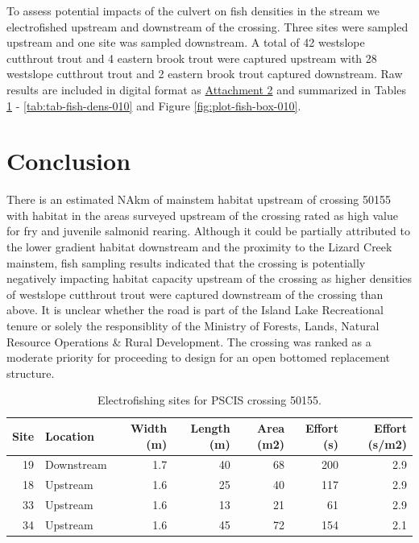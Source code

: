 \documentclass[
]{book}
\begin{document}
To assess potential impacts of the culvert on fish densities in the stream we electrofished upstream and downstream of the crossing. Three sites were sampled upstream and one site was sampled downstream. A total of 42 westslope cutthrout trout and 4 eastern brook trout were captured upstream with 28 westslope cutthrout trout and 2 eastern brook trout captured downstream. Raw results are included in digital format as \href{https://github.com/NewGraphEnvironment/fish_passage_elk_2020_reporting/raw/master/data/habitat_confirmations.xls}{Attachment 2} and summarized in Tables \ref{tab:tab-fish-site-010} - \ref{tab:tab-fish-dens-010} and Figure \ref{fig:plot-fish-box-010}.

\hypertarget{conclusion-1}{%
\section*{Conclusion}\label{conclusion-1}}

There is an estimated NAkm of mainstem habitat upstream of crossing 50155 with habitat in the areas surveyed upstream of the crossing rated as high value for fry and juvenile salmonid rearing. Although it could be partially attributed to the lower gradient habitat downstream and the proximity to the Lizard Creek mainstem, fish sampling results indicated that the crossing is potentially negatively impacting habitat capacity upstream of the crossing as higher densities of westslope cutthrout trout were captured downstream of the crossing than above. It is unclear whether the road is part of the Island Lake Recreational tenure or solely the responsiblity of the Ministry of Forests, Lands, Natural Resource Operations \& Rural Development. The crossing was ranked as a moderate priority for proceeding to design for an open bottomed replacement structure.

\begin{table}

\caption{\label{tab:tab-fish-site-010}Electrofishing sites for PSCIS crossing 50155.}
\centering
\begin{tabular}[t]{r|l|r|r|r|r|r}
\hline
Site & Location & Width (m) & Length (m) & Area (m2) & Effort (s) & Effort (s/m2)\\
\hline
19 & Downstream & 1.7 & 40 & 68 & 200 & 2.9\\
\hline
18 & Upstream & 1.6 & 25 & 40 & 117 & 2.9\\
\hline
33 & Upstream & 1.6 & 13 & 21 & 61 & 2.9\\
\hline
34 & Upstream & 1.6 & 45 & 72 & 154 & 2.1\\
\hline
\end{tabular}
\end{table}
\end{document}
